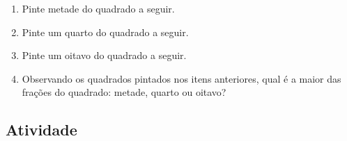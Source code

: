 \begin{enumerate} [\quad a)] %
  \item     Pinte metade do quadrado a seguir.

  \begin{center}
  \end{center}

  \item     Pinte um quarto do quadrado a seguir.

  \begin{center}
  \end{center}

  \item     Pinte um oitavo do quadrado a seguir.

  \begin{center}
  \end{center}
  \item     Observando os quadrados pintados nos itens anteriores, qual é a maior das frações do quadrado: metade, quarto ou oitavo?
\end{enumerate} %


\subsection{Atividade}

